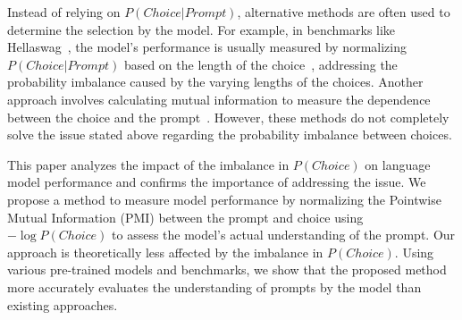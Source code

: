 Instead of relying on {\small $P(Choice|Prompt)$}, alternative methods are often used to determine the selection by the model. For example, in benchmarks like Hellaswag~\cite{hellaswag}, the model's performance is usually measured by normalizing {\small $P(Choice|Prompt)$} based on the length of the choice~\citep{eval-harness, zhang2024tinyllama}, addressing the probability imbalance caused by the varying lengths of the choices. Another approach involves calculating mutual information to measure the dependence between the choice and the prompt~\cite{eval-harness}. However, these methods do not completely solve the issue stated above regarding the probability imbalance between choices.

This paper analyzes the impact of the imbalance in {\small $P(Choice)$} on language model performance and confirms the importance of addressing the issue. We propose a method to measure model performance by normalizing the Pointwise Mutual Information (PMI) between the prompt and choice using {\small $-\log P(Choice)$} to assess the model's actual understanding of the prompt. Our approach is theoretically less affected by the imbalance in {\small $P(Choice)$}. Using various pre-trained models and benchmarks, we show that the proposed method more accurately evaluates the understanding of prompts by the model than existing approaches.
